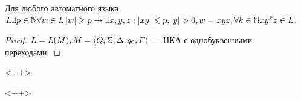 \begin{Th}
  Для любого автоматного языка $L \exists p \in \mathbb{N} \forall w \in L \left\lvert w \right\rvert \geqslant p \to 
  \exists x, y, z : \left\lvert xy \right\rvert \leqslant p, \left\lvert y \right\rvert > 0, w = xyz, \forall k \in \mathbb{N} xy^kz \in L$.
  \begin{proof}
	$L = L(M), M = \braket{Q, \Sigma, \Delta, q_0, F}$ --- НКА с однобуквенными переходами.
  \end{proof}<++>
\end{Th}<++>



